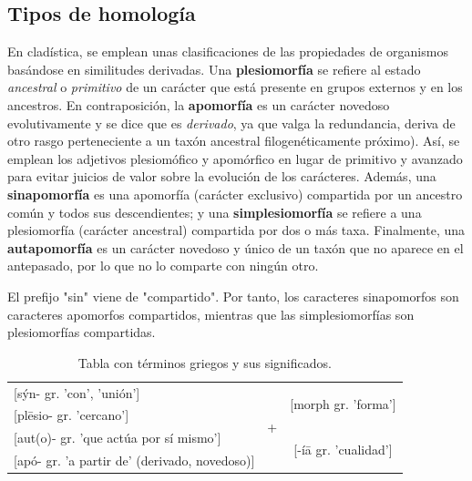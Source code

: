 \subsection{Tipos de homología}
En cladística, se emplean unas clasificaciones de las propiedades de organismos basándose en similitudes derivadas. Una \textbf{plesiomorfía} se refiere al estado \textit{ancestral} o \textit{primitivo} de un carácter que está presente en grupos externos y en los ancestros. En contraposición, la \textbf{apomorfía} es un carácter novedoso evolutivamente y se dice que es \textit{derivado}, ya que valga la redundancia, deriva de otro rasgo perteneciente a un taxón ancestral filogenéticamente próximo). Así, se emplean los adjetivos plesiomófico y apomórfico en lugar de primitivo y avanzado para evitar juicios de valor sobre la evolución de los carácteres. 
Además, una \textbf{sinapomorfía} es una apomorfía (carácter exclusivo) compartida por un ancestro común y todos sus descendientes; y una \textbf{simplesiomorfía} se refiere a una plesiomorfía (carácter ancestral) compartida por dos o más taxa. Finalmente, una \textbf{autapomorfía} es un carácter novedoso y único de un taxón que no aparece en el antepasado, por lo que no lo comparte con ningún otro. 

\begin{table}[htbp]
\begin{mdframed}[backgroundcolor=black!10]
    \centering
    El prefijo "sin" viene de "compartido". Por tanto, los caracteres sinapomorfos son caracteres apomorfos compartidos, mientras que las simplesiomorfías son plesiomorfías compartidas.
    \end{mdframed}
\end{table}

\begin{table}[h]
\centering
\begin{tabular}{l c c }
\hline
\multicolumn{1}{l}{[sýn- gr. 'con', 'unión']} & \multirow{4}{*}{+} & \multirow{2}{*}{[morph gr. 'forma']} \\
\multicolumn{1}{l}{[plēsio- gr. 'cercano']} & &  \\
\multicolumn{1}{l}{[aut(o)- gr. 'que actúa por sí mismo']} & & \multirow{2}{*}{[-íā gr. 'cualidad']}  \\
\multicolumn{1}{l}{[apó- gr. 'a partir de' (derivado, novedoso)]} & & \\
\hline
\end{tabular}
\caption{Tabla con términos griegos y sus significados.}
\end{table}

